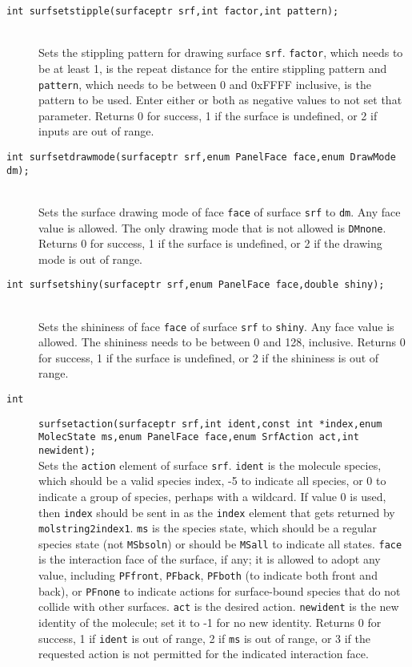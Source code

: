 \documentclass {book}
\newcommand {\ttt} {\texttt}
\begin{document}
\begin{description}
\item[\ttt{int surfsetstipple(surfaceptr srf,int factor,int pattern);}]
\hfill \\
Sets the stippling pattern for drawing surface \ttt{srf}. \ttt{factor}, which needs to be at least 1, is the repeat distance for the entire stippling pattern and \ttt{pattern}, which needs to be between 0 and 0xFFFF inclusive, is the pattern to be used. Enter either or both as negative values to not set that parameter. Returns 0 for success, 1 if the surface is undefined, or 2 if inputs are out of range.

\item[\ttt{int surfsetdrawmode(surfaceptr srf,enum PanelFace face,enum DrawMode dm);}]
\hfill \\
Sets the surface drawing mode of face \ttt{face} of surface \ttt{srf} to \ttt{dm}. Any face value is allowed. The only drawing mode that is not allowed is \ttt{DMnone}. Returns 0 for success, 1 if the surface is undefined, or 2 if the drawing mode is out of range.

\item[\ttt{int surfsetshiny(surfaceptr srf,enum PanelFace face,double shiny);}]
\hfill \\
Sets the shininess of face \ttt{face} of surface \ttt{srf} to \ttt{shiny}. Any face value is allowed. The shininess needs to be between 0 and 128, inclusive. Returns 0 for success, 1 if the surface is undefined, or 2 if the shininess is out of range.

\item[\ttt{int}]
\ttt{surfsetaction(surfaceptr srf,int ident,const int *index,enum MolecState ms,enum PanelFace face,enum SrfAction act,int newident);}
\hfill \\
Sets the \ttt{action} element of surface \ttt{srf}. \ttt{ident} is the molecule species, which should be a valid species index, -5 to indicate all species, or 0 to indicate a group of species, perhaps with a wildcard. If value 0 is used, then \ttt{index} should be sent in as the \ttt{index} element that gets returned by \ttt{molstring2index1}. \ttt{ms} is the species state, which should be a regular species state (not \ttt{MSbsoln}) or should be \ttt{MSall} to indicate all states. \ttt{face} is the interaction face of the surface, if any; it is allowed to adopt any value, including \ttt{PFfront}, \ttt{PFback}, \ttt{PFboth} (to indicate both front and back), or \ttt{PFnone} to indicate actions for surface-bound species that do not collide with other surfaces. \ttt{act} is the desired action. \ttt{newident} is the new identity of the molecule; set it to -1 for no new identity. Returns 0 for success, 1 if \ttt{ident} is out of range, 2 if \ttt{ms} is out of range, or 3 if the requested action is not permitted for the indicated interaction face.


\end{description}
\end{document}

